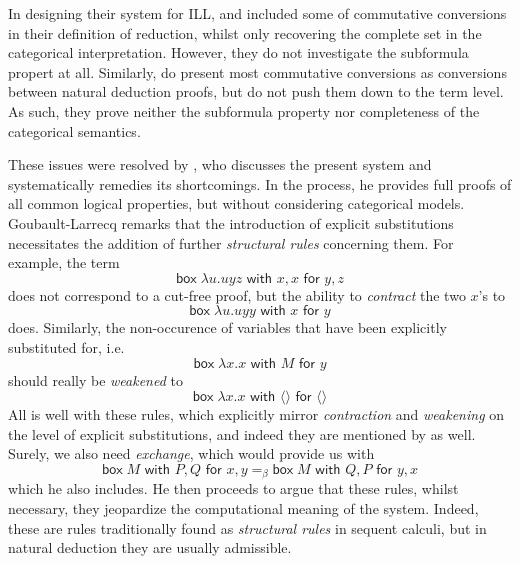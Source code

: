 \documentclass[a4paper]{amsart}
\newcommand{\ibox}[1]{\mathsf{box\;}#1}
\begin{document}
In designing their system for \textsf{ILL}, \cite{Bierman1992} and
\cite{Benton1993b} included some of commutative conversions in
their definition of reduction, whilst only recovering the complete
set in the categorical interpretation. However, they do not
investigate the subformula propert at all. Similarly,
\cite{Bierman2000a} do present most commutative conversions as
conversions between natural deduction proofs, but do not push them
down to the term level. As such, they prove neither the subformula
property nor completeness of the categorical semantics.

These issues were resolved by \cite{Goubault-Larrecq1996}, who
discusses the present system and systematically remedies its
shortcomings. In the process, he provides full proofs of all
common logical properties, but without considering categorical
models. Goubault-Larrecq remarks that the introduction of explicit
substitutions necessitates the addition of further
\emph{structural rules} concerning them. For example, the term \[
  \ibox{\lambda u. uyz} \textsf{ with } x, x \textsf{ for } y, z
\] does not correspond to a cut-free proof, but the ability to
\emph{contract} the two $x$'s to \[
  \ibox{\lambda u. uyy} \textsf{ with } x \textsf{ for } y
\] does. Similarly, the non-occurence of variables that have been
explicitly substituted for, i.e. \[
  \ibox{\lambda x. x} \textsf{ with } M \textsf{ for } y
\] should really be \emph{weakened} to \[
  \ibox{\lambda x. x} \textsf{ with } \langle\rangle \textsf{ for
  } \langle\rangle
\] All is well with these rules, which explicitly mirror
\emph{contraction} and \emph{weakening} on the level of explicit
substitutions, and indeed they are mentioned by
\cite{Bierman2000a} as well. Surely, we also need \emph{exchange},
which would provide us with \[
  \ibox{M} \textsf{ with } P, Q \textsf{ for } x, y =_\beta
    \ibox{M} \textsf{ with } {Q, P} \textsf{ for } y, x
\] which he also includes. He then proceeds to argue that these
rules, whilst necessary, they jeopardize the computational meaning
of the system.  Indeed, these are rules traditionally found as
\emph{structural rules} in sequent calculi, but in natural
deduction they are usually admissible.
\end{document}

